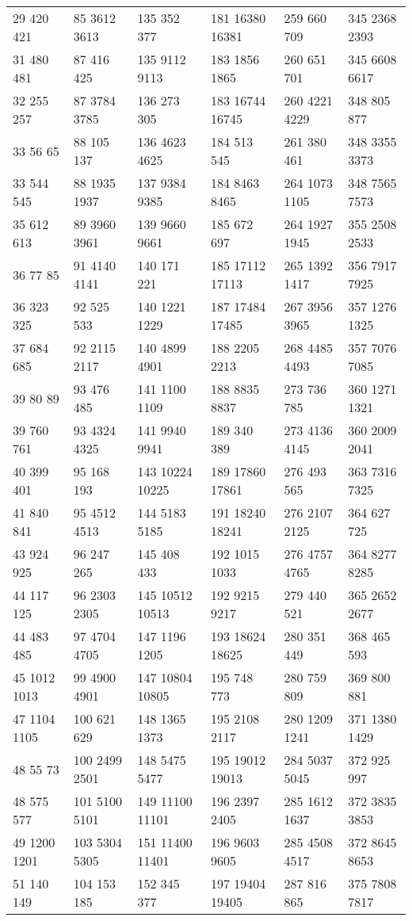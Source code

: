 \begin{center}
\begin{longtable}{llllll}
29 420 421&85 3612 3613&135 352 377&181 16380 16381&259 660 709&345 2368 2393\\
31 480 481&87 416 425&135 9112 9113&183 1856 1865&260 651 701&345 6608 6617\\
32 255 257&87 3784 3785&136 273 305&183 16744 16745&260 4221 4229&348 805 877\\
33 56 65&88 105 137&136 4623 4625&184 513 545&261 380 461&348 3355 3373\\
33 544 545&88 1935 1937&137 9384 9385&184 8463 8465&264 1073 1105&348 7565 7573\\
35 612 613&89 3960 3961&139 9660 9661&185 672 697&264 1927 1945&355 2508 2533\\
36 77 85&91 4140 4141&140 171 221&185 17112 17113&265 1392 1417&356 7917 7925\\
36 323 325&92 525 533&140 1221 1229&187 17484 17485&267 3956 3965&357 1276 1325\\
37 684 685&92 2115 2117&140 4899 4901&188 2205 2213&268 4485 4493&357 7076 7085\\
39 80 89&93 476 485&141 1100 1109&188 8835 8837&273 736 785&360 1271 1321\\
39 760 761&93 4324 4325&141 9940 9941&189 340 389&273 4136 4145&360 2009 2041\\
40 399 401&95 168 193&143 10224 10225&189 17860 17861&276 493 565&363 7316 7325\\
41 840 841&95 4512 4513&144 5183 5185&191 18240 18241&276 2107 2125&364 627 725\\
43 924 925&96 247 265&145 408 433&192 1015 1033&276 4757 4765&364 8277 8285\\
44 117 125&96 2303 2305&145 10512 10513&192 9215 9217&279 440 521&365 2652 2677\\
44 483 485&97 4704 4705&147 1196 1205&193 18624 18625&280 351 449&368 465 593\\
45 1012 1013&99 4900 4901&147 10804 10805&195 748 773&280 759 809&369 800 881\\
47 1104 1105&100 621 629&148 1365 1373&195 2108 2117&280 1209 1241&371 1380 1429\\
48 55 73&100 2499 2501&148 5475 5477&195 19012 19013&284 5037 5045&372 925 997\\
48 575 577&101 5100 5101&149 11100 11101&196 2397 2405&285 1612 1637&372 3835 3853\\
49 1200 1201&103 5304 5305&151 11400 11401&196 9603 9605&285 4508 4517&372 8645 8653\\
51 140 149&104 153 185&152 345 377&197 19404 19405&287 816 865&375 7808 7817\\

\end{longtable}
\end{center}
